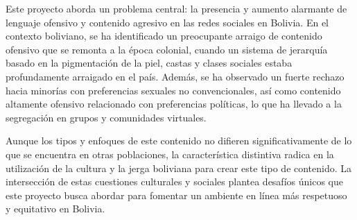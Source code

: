 Este proyecto aborda un problema central: la presencia y aumento alarmante de lenguaje ofensivo y 
contenido agresivo en las redes sociales en Bolivia. En el contexto boliviano, se ha identificado un preocupante arraigo de contenido ofensivo que se remonta a la época colonial, cuando un sistema de jerarquía basado en la pigmentación de la piel, castas y clases sociales estaba profundamente arraigado en el país. Además, se ha observado un fuerte rechazo hacia minorías con preferencias sexuales no convencionales, así como contenido altamente ofensivo relacionado con preferencias políticas, lo que ha llevado a la segregación en grupos y comunidades virtuales.

Aunque los tipos y enfoques de este contenido no difieren significativamente de lo que se encuentra en otras poblaciones, la característica distintiva radica en la utilización de la cultura y la jerga boliviana para crear este tipo de contenido. La intersección de estas cuestiones culturales y sociales plantea desafíos únicos que este proyecto busca abordar para fomentar un ambiente en línea más respetuoso y equitativo en Bolivia.
